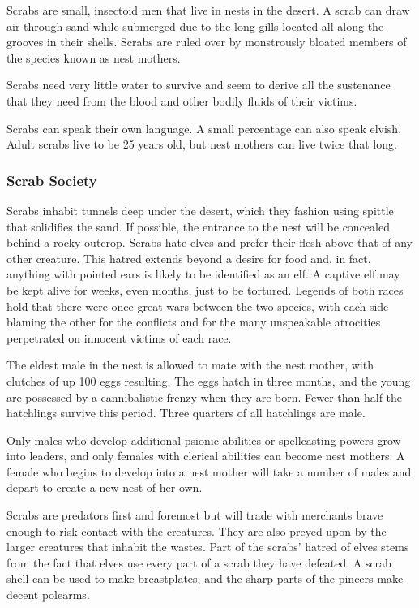 Scrabs are small, insectoid men that live in nests in the desert. A scrab can draw air through sand while submerged due to the long gills located all along the grooves in their shells. Scrabs are ruled over by monstrously bloated members of the species known as nest mothers.

Scrabs need very little water to survive and seem to derive all the sustenance that they need from the blood and other bodily fluids of their victims.

Scrabs can speak their own language. A small percentage can also speak elvish. Adult scrabs live to be 25 years old, but nest mothers can live twice that long.


\subsubsection{Scrab Society}
Scrabs inhabit tunnels deep under the desert, which they fashion using spittle that solidifies the sand. If possible, the entrance to the nest will be concealed behind a rocky outcrop. Scrabs hate elves and prefer their flesh above that of any other creature. This hatred extends beyond a desire for food and, in fact, anything with pointed ears is likely to be identified as an elf. A captive elf may be kept alive for weeks, even months, just to be tortured. Legends of both races hold that there were once great wars between the two species, with each side blaming the other for the conflicts and for the many unspeakable atrocities perpetrated on innocent victims of each race.

The eldest male in the nest is allowed to mate with the nest mother, with clutches of up 100 eggs resulting. The eggs hatch in three months, and the young are possessed by a cannibalistic frenzy when they are born. Fewer than half the hatchlings survive this period. Three quarters of all hatchlings are male.

Only males who develop additional psionic abilities or spellcasting powers grow into leaders, and only females with clerical abilities can become nest mothers. A female who begins to develop into a nest mother will take a number of males and depart to create a new nest of her own.

Scrabs are predators first and foremost but will trade with merchants brave enough to risk contact with the creatures. They are also preyed upon by the larger creatures that inhabit the wastes. Part of the scrabs' hatred of elves stems from the fact that elves use every part of a scrab they have defeated. A scrab shell can be used to make breastplates, and the sharp parts of the pincers make decent polearms.

